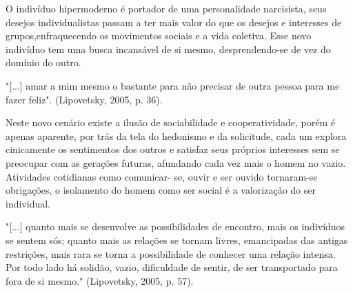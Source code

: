 \documentclass{article}
\begin{document}
O indivíduo hipermoderno é portador de uma personalidade narcisista, seus desejos 
individualistas passam a ter mais valor do que os desejos e interesses de grupos,enfraquecendo os movimentos sociais e a vida coletiva. Esse novo indivíduo tem uma busca 
incansável de si mesmo, desprendendo-se de vez do domínio do outro. 

"[...] amar a mim 
mesmo o bastante para não precisar de outra pessoa para me fazer feliz". (Lipovetsky, 2005, 
p. 36).


Neste novo cenário existe a ilusão de sociabilidade e cooperatividade, porém é apenas 
aparente, por trás da tela do hedonismo e da solicitude, cada um explora cinicamente os 
sentimentos dos outros e satisfaz seus próprios interesses sem se preocupar com as gerações 
futuras, afundando cada vez mais o homem no vazio. Atividades cotidianas como comunicar-
se, ouvir e ser ouvido tornaram-se obrigações, o isolamento do homem como ser social é a 
valorização do ser individual.


"[...] quanto mais se desenvolve as possibilidades de encontro, mais os indivíduos se 
sentem sós; quanto mais as relações se tornam livres, emancipadas das antigas 
restrições, mais rara se torna a possibilidade de conhecer uma relação intensa. Por 
todo lado há solidão, vazio, dificuldade de sentir, de ser transportado para fora de si 
mesmo." (Lipovetsky, 2005, p. 57).
\end{document}
